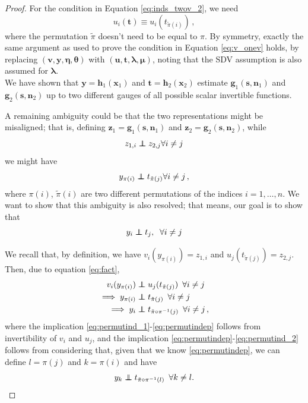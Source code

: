 \documentclass[letterpaper]{article}
\newcommand\independent{\protect\mathpalette{\protect\independenT}{\perp}}
\def\independenT#1#2{\mathrel{\rlap{$#1#2$}\mkern2mu{#1#2}}}
\theoremstyle{definition}
\begin{document}
\begin{proof}
For the condition in Equation \ref{eq:inds_twov_2}, we need
\begin{equation}
\label{eq:u_onev}
u_{i}(\bm{t})  \equiv u_{i}(t_{\tilde{\pi}(i)})\,,
\end{equation}
where the permutation $\tilde{\pi}$ doesn't need to be equal to $\pi$.
By symmetry, exactly the same argument as used to prove the condition in Equation \ref{eq:v_onev} holds, by replacing $(\bm{v},\bm{y}, \bm{\eta}, \bm{\theta})$ with $(\bm{u},\bm{t}, \bm{\lambda}, \bm{\mu})$, noting that the SDV assumption is also assumed for $\bm{\lambda}$.
\\
We have shown that $\bm{y}=\bm{h}_1(\bm{x}_1)$ and $\bm{t}=\bm{h}_2(\bm{x}_2)$ estimate $\bm{g}_1(\bm{s}, \bm{n}_1)$ and $\bm{g}_2(\bm{s}, \bm{n}_2)$ up to two different gauges of all possible scalar invertible functions.

A remaining ambiguity could be that the two representations might be misaligned; that is, defining $\bm{z}_1=\bm{g}_1(\bm{s}, \bm{n}_1)$ and $\bm{z}_2=\bm{g}_2(\bm{s}, \bm{n}_2)$, while
\begin{equation}
z_{1,i} \independent z_{2,j} \forall i \neq j \label{eq:fact}
\end{equation}
we might have
\[
y_{\pi(i)} \independent t_{\tilde{\pi}(j)} \forall i \neq j\,,
\]
where $\pi(i)$, $\tilde{\pi}(i)$ are two different permutations of the indices $i=1, \ldots, n$. We want to show that this ambiguity is also resolved; that means, our goal is to show that
\begin{equation}
y_{i} \independent t_{j},\;\;\forall i \neq j \label{eq:aim_lastpart}
\end{equation}


We recall that, by definition, we have $v_i(y_{\pi(i)}) = z_{1,i}$ and $u_j(t_{\tilde{\pi}(j)}) = z_{2,j}$. Then, due to equation \ref{eq:fact},
\begin{align}
v_i(y_{\pi(i)}) & \independent u_j(t_{\tilde{\pi}(j)}) \,\,\, \forall i \neq j \label{eq:permutind_1}\\
\implies y_{\pi(i)} & \independent t_{\tilde{\pi}(j)} \,\,\, \forall i \neq j \label{eq:permutindep}\\
\implies y_{i} & \independent t_{\tilde{\pi}\circ \pi^{-1} (j)} \,\,\, \forall i \neq j\,, \label{eq:permutind_2}
\end{align}
where the implication \ref{eq:permutind_1}-\ref{eq:permutindep} follows from invertibility of $v_i$ and $u_j$, and the implication \ref{eq:permutindep}-\ref{eq:permutind_2} follows from considering that, given that we know \ref{eq:permutindep}, we can define $l=\pi(j)$ and $k=\pi(i)$ and have
\[
y_{k}  \independent t_{\tilde{\pi} \circ \pi^{-1} (l)} \,\,\, \forall k \neq l.
\]


\end{proof}
\end{document}
